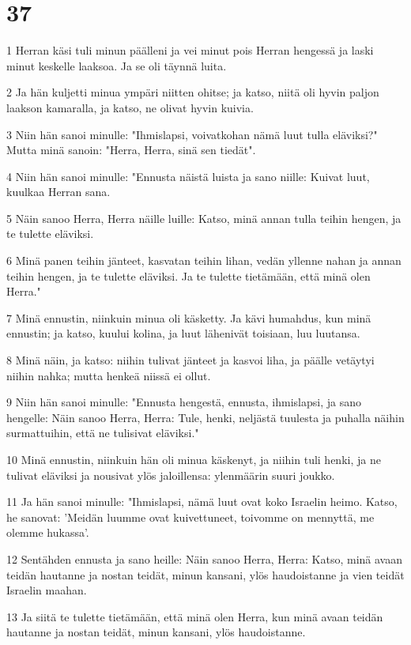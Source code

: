 \chapter{37}

\par 1 Herran käsi tuli minun päälleni ja vei minut pois Herran hengessä ja laski minut keskelle laaksoa. Ja se oli täynnä luita.
\par 2 Ja hän kuljetti minua ympäri niitten ohitse; ja katso, niitä oli hyvin paljon laakson kamaralla, ja katso, ne olivat hyvin kuivia.
\par 3 Niin hän sanoi minulle: "Ihmislapsi, voivatkohan nämä luut tulla eläviksi?" Mutta minä sanoin: "Herra, Herra, sinä sen tiedät".
\par 4 Niin hän sanoi minulle: "Ennusta näistä luista ja sano niille: Kuivat luut, kuulkaa Herran sana.
\par 5 Näin sanoo Herra, Herra näille luille: Katso, minä annan tulla teihin hengen, ja te tulette eläviksi.
\par 6 Minä panen teihin jänteet, kasvatan teihin lihan, vedän yllenne nahan ja annan teihin hengen, ja te tulette eläviksi. Ja te tulette tietämään, että minä olen Herra."
\par 7 Minä ennustin, niinkuin minua oli käsketty. Ja kävi humahdus, kun minä ennustin; ja katso, kuului kolina, ja luut lähenivät toisiaan, luu luutansa.
\par 8 Minä näin, ja katso: niihin tulivat jänteet ja kasvoi liha, ja päälle vetäytyi niihin nahka; mutta henkeä niissä ei ollut.
\par 9 Niin hän sanoi minulle: "Ennusta hengestä, ennusta, ihmislapsi, ja sano hengelle: Näin sanoo Herra, Herra: Tule, henki, neljästä tuulesta ja puhalla näihin surmattuihin, että ne tulisivat eläviksi."
\par 10 Minä ennustin, niinkuin hän oli minua käskenyt, ja niihin tuli henki, ja ne tulivat eläviksi ja nousivat ylös jaloillensa: ylenmäärin suuri joukko.
\par 11 Ja hän sanoi minulle: "Ihmislapsi, nämä luut ovat koko Israelin heimo. Katso, he sanovat: 'Meidän luumme ovat kuivettuneet, toivomme on mennyttä, me olemme hukassa'.
\par 12 Sentähden ennusta ja sano heille: Näin sanoo Herra, Herra: Katso, minä avaan teidän hautanne ja nostan teidät, minun kansani, ylös haudoistanne ja vien teidät Israelin maahan.
\par 13 Ja siitä te tulette tietämään, että minä olen Herra, kun minä avaan teidän hautanne ja nostan teidät, minun kansani, ylös haudoistanne.
